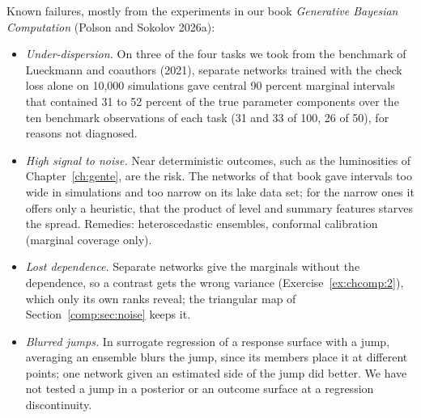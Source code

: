 Known failures, mostly from the experiments in our book \emph{Generative Bayesian Computation} (Polson and Sokolov 2026a):
\begin{itemize}
\item \emph{Under-dispersion.} On three of the four tasks we took from the benchmark of Lueckmann and coauthors (2021), separate networks trained with the check loss alone on 10,000 simulations gave central 90 percent marginal intervals that contained 31 to 52 percent of the true parameter components over the ten benchmark observations of each task (31 and 33 of 100, 26 of 50), for reasons not diagnosed.
\item \emph{High signal to noise.} Near deterministic outcomes, such as the luminosities of Chapter~\ref{ch:gente}, are the risk. The networks of that book gave intervals too wide in simulations and too narrow on its lake data set; for the narrow ones it offers only a heuristic, that the product of level and summary features starves the spread. Remedies: heteroscedastic ensembles, conformal calibration (marginal coverage only).
\item \emph{Lost dependence.} Separate networks give the marginals without the dependence, so a contrast gets the wrong variance (Exercise~\ref{ex:chcomp:2}), which only its own ranks reveal; the triangular map of Section~\ref{comp:sec:noise} keeps it.
\item \emph{Blurred jumps.} In surrogate regression of a response surface with a jump, averaging an ensemble blurs the jump, since its members place it at different points; one network given an estimated side of the jump did better. We have not tested a jump in a posterior or an outcome surface at a regression discontinuity.
\end{itemize}
